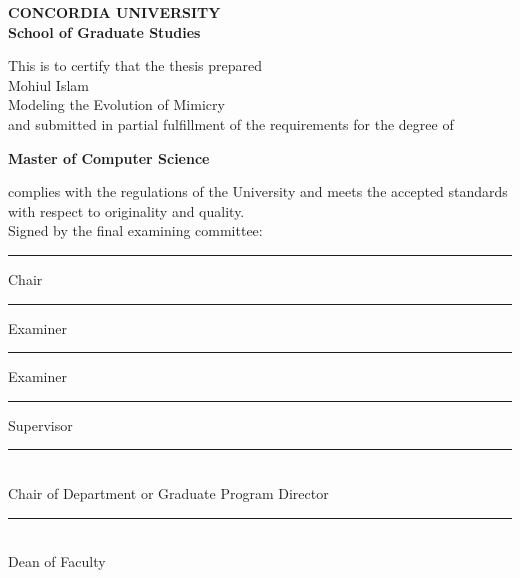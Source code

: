 \begin{titlepage}
\begin{center}
\Large \textbf{CONCORDIA UNIVERSITY}\\
\Large \textbf{School of Graduate Studies}\\[2cm]
\end{center}
This is to certify that the thesis prepared\\
 Mohiul Islam\\
  Modeling the Evolution of Mimicry\\
and submitted in partial fulfillment of the requirements for the degree of
\begin{center}
\small \textbf{Master of Computer Science}\\
\end{center}
complies with the regulations of the University and meets the accepted standards with respect to originality and quality.\\[1cm]
Signed by the final examining committee:\\

\begin{flushright}
\begin{minipage}{10cm}
\rule{7cm}{0.1mm} Chair\\[0.4cm]
\rule{7cm}{0.1mm} Examiner\\[0.4cm]
\rule{7cm}{0.1mm} Examiner\\[0.4cm]
\rule{7cm}{0.1mm} Supervisor\\[0.8cm]
\end{minipage}
\end{flushright}
 \rule{10cm}{0.1mm}\\ 
\makebox[5cm][l]{} Chair of Department or Graduate Program Director\\[1cm]
 \rule{10cm}{0.1mm}\\ 
\makebox[5cm][l]{} Dean of Faculty

\end{titlepage}